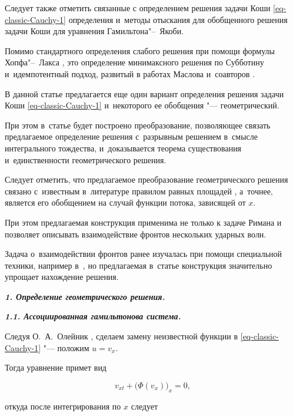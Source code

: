 Следует также отметить связанные с определением решения задачи Коши \eqref{eq-classic-Cauchy-1} определения и~методы отыскания для обобщенного решения задачи Коши для уравнения Гамильтона"--~Якоби. 

Помимо стандартного определения слабого решения при помощи формулы Хопфа"--~Лакса \cite{Evans,  LaxWendroff}, это определение минимаксного решения по Субботину~\cite{Subbotin} и~идемпотентный подход, развитый в работах Маслова и~соавторов \cite{Maslov, Maslov2}.



В данной статье предлагается еще один вариант определения решения задачи Коши \eqref{eq-classic-Cauchy-1} и~некоторого ее обобщения "--- геометрический. 

При этом в~статье будет построено преобразование, позволяющее связать предлагаемое определение решения с~разрывным решением в~смысле интегрального тождества, и~доказывается теорема существования и~единственности геометрического решения. 

Следует отметить, что предлагаемое преобразование геометрического решения связано с~известным в~литературе правилом равных площадей \cite{Whitham}, а~точнее, является его обобщением на случай функции потока, зависящей от $x$. 

При этом предлагаемая конструкция применима не только к задаче Римана и позволяет описывать взаимодействие фронтов нескольких ударных волн. 

Задача о~взаимодействии фронтов ранее изучалась при помощи специальной техники, например в~\cite{DOmSh}, но предлагаемая в~статье конструкция значительно упрощает нахождение решения.



\bigskip



{\bf \itshape 1. Определение геометрического решения.}



\smallskip

{\bf \itshape 1.1. Ассоциированная гамильтонова система.}

Следуя О.~А.~Олейник \cite{Oleinik}, сделаем замену неизвестной функции в \eqref{eq-classic-Cauchy-1} "--- положим $u=v_x$.

Тогда уравнение примет вид

$$

v_{xt}+\bigl(\Phi(v_x)\bigr)_x=0,

$$

откуда после интегрирования по $x$ следует

